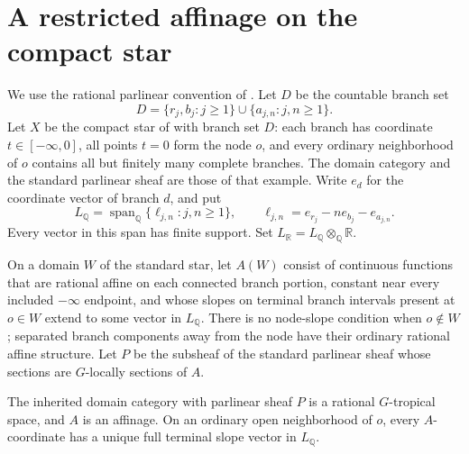 \documentclass[11pt,a4paper]{amsart}
\begin{document}
\section{A restricted affinage on the compact star}\label{sec:affinage}

We use the rational parlinear convention of \cite[\S\S1.8.2 and~1.8.8]{CLD12}. Let $D$ be the countable branch set
\[
 D=\{r_j,b_j:j\geq1\}\cup\{a_{j,n}:j,n\geq1\}.
\]
Let $X$ be the compact star of \cite[\S6.7.3]{CLD12} with branch set $D$: each branch has coordinate $t\in[-\infty,0]$, all points $t=0$ form the node $o$, and every ordinary neighborhood of $o$ contains all but finitely many complete branches. The domain category and the standard parlinear sheaf are those of that example. Write $e_d$ for the coordinate vector of branch $d$, and put
\begin{equation}\label{eq:slope-space}
 L_{\mathbb Q}=\operatorname{span}_{\mathbb Q}\{\ell_{j,n}:j,n\geq1\},\qquad
 \ell_{j,n}=e_{r_j}-n e_{b_j}-e_{a_{j,n}}.
\end{equation}
Every vector in this span has finite support. Set $L_{\mathbb R}=L_{\mathbb Q}\otimes_{\mathbb Q}\mathbb R$.

On a domain $W$ of the standard star, let $A(W)$ consist of continuous functions that are rational affine on each connected branch portion, constant near every included $-\infty$ endpoint, and whose slopes on terminal branch intervals present at $o\in W$ extend to some vector in $L_{\mathbb Q}$. There is no node-slope condition when $o\notin W$; separated branch components away from the node have their ordinary rational affine structure. Let $P$ be the subsheaf of the standard parlinear sheaf whose sections are $G$-locally sections of $A$.

\begin{lemma}\label{lem:site-inheritance}
The inherited domain category with parlinear sheaf $P$ is a rational $G$-tropical space, and $A$ is an affinage. On an ordinary open neighborhood of $o$, every $A$-coordinate has a unique full terminal slope vector in $L_{\mathbb Q}$.
\end{lemma}
\end{document}

